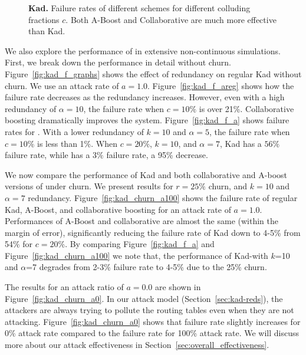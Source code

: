 \begin{figure}[t!]
\centering
\caption{{\bf Kad.} Failure rates of different \ksys schemes for
   different colluding fractions $c$. Both A-Boost and Collaborative are
   much more effective than Kad.}
      \label{fig:kad_churn_graphs}
\end{figure}



 We also explore the performance of \ksys in
extensive non-continuous simulations. First, we break down the
performance in detail without churn. Figure~\ref{fig:kad_f_graphs} shows
the effect of redundancy on regular Kad without churn.
We use an attack rate of $a=1.0$. Figure~\ref{fig:kad_f_areg} shows how
the failure rate decreases as the redundancy increases. However, even
with a high redundancy of $\alpha=10$, the failure rate when $c=10\%$ is
over 21\%. Collaborative boosting dramatically improves the
system. Figure~\ref{fig:kad_f_a} shows failure rates for \ksys. With a
lower redundancy of $k=10$ and $\alpha=5$, the failure rate when
$c=10\%$ is less than 1\%. When $c=20\%$, $k=10$, and $\alpha=7$, Kad
has a $56\%$ failure rate, while \ksys has a $3\%$ failure rate, a 95\%
decrease.



 We now compare the performance of
Kad and both collaborative and A-boost versions of \ksys under churn. 
We present results for $r=25\%$ churn, and $k=10$ and $\alpha=7$
redundancy. Figure~\ref{fig:kad_churn_a100} shows the failure rate of
regular Kad, A-Boost, and collaborative boosting for an attack rate of
$a=1.0$. Performances of A-Boost and collaborative are almost the same
(within the margin of error), significantly reducing the failure rate
of Kad down to 4-5\% from 54\% for $c=20\%$. By comparing
Figure~\ref{fig:kad_f_a} and Figure~\ref{fig:kad_churn_a100} we note
that, the performance of Kad-\sys with $k$=10 and $\alpha$=7 degrades
from 2-3\% failure rate to 4-5\% due to the 25\% churn. 


The results for an attack ratio of $a=0.0$ are shown in
Figure~\ref{fig:kad_churn_a0}. In our attack model
(Section~\ref{sec:kad-reds}), the attackers are always trying to
pollute the routing tables even when they are not attacking.
Figure~\ref{fig:kad_churn_a0} shows that failure rate slightly increases
for 0\% attack rate compared to the failure rate for 100\% attack
rate. We will discuss more about our attack effectiveness in
Section~\ref{sec:overall_effectiveness}.


